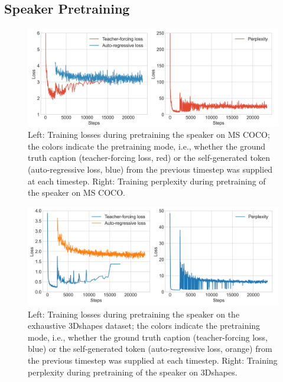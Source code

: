 \subsection{Speaker Pretraining}
\label{speaker_pretraining}
\begin{figure}[h]
	\centering
	\includegraphics[width=\linewidth]{images/coco_pretraining_losses_ppls.png}
	\caption{Left: Training losses during pretraining the speaker on MS COCO; the colors indicate the pretraining mode, i.e., whether the ground truth caption (teacher-forcing loss, red) or the self-generated token (auto-regressive loss, blue) from the previous timestep was supplied at each timestep. Right: Training perplexity during pretraining of the speaker on MS COCO.}
	\label{fig:coco_pretraining}
\end{figure}  

\begin{figure}[h]
	\centering
	\includegraphics[width=\linewidth]{images/3dshapes_pretraining_losses_ppls.png}
	\caption{Left: Training losses during pretraining the speaker on the exhaustive 3Dshapes dataset; the colors indicate the pretraining mode, i.e., whether the ground truth caption (teacher-forcing loss, blue) or the self-generated token (auto-regressive loss, orange) from the previous timestep was supplied at each timestep. Right: Training perplexity during pretraining of the speaker on 3Dshapes.}
	\label{fig:3dshapes_pretraining}
\end{figure}  

